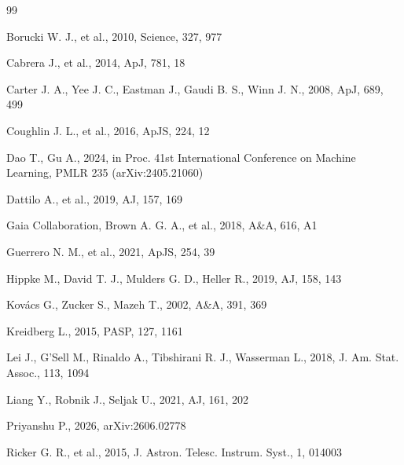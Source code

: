 \documentclass[fleqn,usenatbib]{mnras}
\begin{document}
\begin{thebibliography}{99}

Borucki W. J., et al., 2010, Science, 327, 977

Cabrera J., et al., 2014, ApJ, 781, 18

Carter J. A., Yee J. C., Eastman J., Gaudi B. S., Winn J. N., 2008, ApJ, 689, 499

Coughlin J. L., et al., 2016, ApJS, 224, 12

Dao T., Gu A., 2024, in Proc. 41st International Conference on Machine Learning, PMLR 235 (arXiv:2405.21060)

Dattilo A., et al., 2019, AJ, 157, 169

Gaia Collaboration, Brown A. G. A., et al., 2018, A\&A, 616, A1

Guerrero N. M., et al., 2021, ApJS, 254, 39

Hippke M., David T. J., Mulders G. D., Heller R., 2019, AJ, 158, 143

Kovács G., Zucker S., Mazeh T., 2002, A\&A, 391, 369

Kreidberg L., 2015, PASP, 127, 1161

Lei J., G'Sell M., Rinaldo A., Tibshirani R. J., Wasserman L., 2018, J. Am. Stat. Assoc., 113, 1094

Liang Y., Robnik J., Seljak U., 2021, AJ, 161, 202

Priyanshu P., 2026, arXiv:2606.02778

Ricker G. R., et al., 2015, J. Astron. Telesc. Instrum. Syst., 1, 014003


\end{thebibliography}
\end{document}
